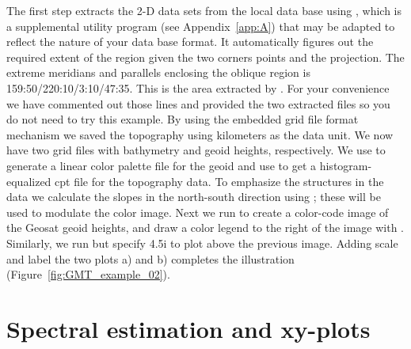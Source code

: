 
The first step extracts the 2-D data sets from the local
data base using , which is a supplemental
utility program (see Appendix~\ref{app:A}) that may be adapted to
reflect the nature of your data base format.  It
automatically figures out the required extent of the region
given the two corners points and the projection.  The extreme
meridians and parallels enclosing the oblique region is
159:50/220:10/3:10/47:35.  This is
the area extracted by .  For your convenience
we have commented out those lines and provided the two
extracted files so you do not need  to try
this example.  By using the embedded grid file format
mechanism we saved the topography using kilometers as the
data unit.  We now have two grid files with bathymetry and
geoid heights, respectively.  We use  to generate
a linear color palette file  for the geoid and use
 to get a histogram-equalized cpt file 
for the topography data.  To emphasize the structures in
the data we calculate the slopes in the north-south direction
using ; these will be used to modulate the
color image.  Next we run  to create a
color-code image of the Geosat geoid heights, and draw a
color legend to the right of the image with .
Similarly, we run  but specify 4.5i
to plot above the previous image.  Adding scale and label
the two plots a) and b) completes the illustration
(Figure~\ref{fig:GMT_example_02}).

\section{Spectral estimation and xy-plots}

